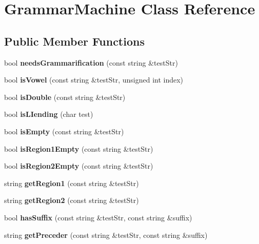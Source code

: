 \section{Grammar\+Machine Class Reference}
\label{class_grammar_machine}
\subsection*{Public Member Functions}
\begin{DoxyCompactItemize}
\item 
\mbox{\label{class_grammar_machine_a4fc47352b2515396e3369119e29247a6}} 
bool {\bfseries needs\+Grammarification} (const string \&test\+Str)
\item 
\mbox{\label{class_grammar_machine_a057c4f2841666182f34e86bdd3b1fa09}} 
bool {\bfseries is\+Vowel} (const string \&test\+Str, unsigned int index)
\item 
\mbox{\label{class_grammar_machine_ae85c8c5e59d197eeade4a33ae8547ef8}} 
bool {\bfseries is\+Double} (const string \&test\+Str)
\item 
\mbox{\label{class_grammar_machine_af680247d962eef73715af8af9ff8996b}} 
bool {\bfseries is\+L\+Iending} (char test)
\item 
\mbox{\label{class_grammar_machine_adc2f35a36233a4aeb38cb7242020b1a0}} 
bool {\bfseries is\+Empty} (const string \&test\+Str)
\item 
\mbox{\label{class_grammar_machine_a853063e550adfbe9105ef8079aa6bb57}} 
bool {\bfseries is\+Region1\+Empty} (const string \&test\+Str)
\item 
\mbox{\label{class_grammar_machine_a9afaad1619f03706381a1a3e4ef2087f}} 
bool {\bfseries is\+Region2\+Empty} (const string \&test\+Str)
\item 
\mbox{\label{class_grammar_machine_ae4a49c63abe8bc2f0b234859a24cd4c4}} 
string {\bfseries get\+Region1} (const string \&test\+Str)
\item 
\mbox{\label{class_grammar_machine_af781d0d6a8570f972ebcb520282817b5}} 
string {\bfseries get\+Region2} (const string \&test\+Str)
\item 
\mbox{\label{class_grammar_machine_a8b862c9f6cdbade789c46299426db738}} 
bool {\bfseries has\+Suffix} (const string \&test\+Str, const string \&suffix)
\item 
\mbox{\label{class_grammar_machine_af144046d98097869f3adda3fb0622c7b}} 
string {\bfseries get\+Preceder} (const string \&test\+Str, const string \&suffix)
\item 
\mbox{\label{class_grammar_machine_a7ebfe602affda583c8e583dc72f188ec}} 

\end{DoxyCompactItemize}
